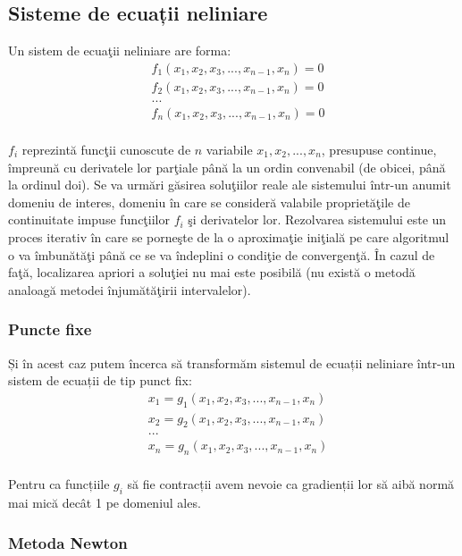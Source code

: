 \documentclass{exam}
\begin{document}
\subsection{Sisteme de ecuații neliniare}
Un sistem de ecuaţii neliniare are forma:
\begin{align*}
	 & f_{1}(x_{1},x_{2},x_{3},...,x_{n-1},x_{n})=0 \\
	 & f_{2}(x_{1},x_{2},x_{3},...,x_{n-1},x_{n})=0 \\
	 & ...                                          \\
	 & f_{n}(x_{1},x_{2},x_{3},...,x_{n-1},x_{n})=0 \\
\end{align*}

$f_{i}$ reprezintă funcţii cunoscute de $n$ variabile $x_{1}, x_{2}, ..., x_{n}$,
presupuse continue, împreună cu derivatele lor parţiale până la un ordin
convenabil (de obicei, până la ordinul doi). Se va urmări găsirea soluţiilor
reale ale sistemului într-un anumit domeniu de interes, domeniu în care se
consideră valabile proprietăţile de continuitate impuse funcţiilor
$f_{i}$ şi derivatelor lor. Rezolvarea sistemului este un proces iterativ în
care se porneşte de la o aproximaţie iniţială pe care algoritmul o va îmbunătăţi
până ce se va îndeplini o condiţie de convergenţă. În cazul de faţă, localizarea
apriori a soluţiei nu mai este posibilă (nu există o metodă analoagă metodei
înjumătăţirii intervalelor).

\subsubsection{Puncte fixe}

Și în acest caz putem încerca să transformăm sistemul de ecuații neliniare
într-un sistem de ecuații de tip punct fix:
\begin{align*}
	 & x_{1} = g_{1}(x_{1},x_{2},x_{3},...,x_{n-1},x_{n}) \\
	 & x_{2} = g_{2}(x_{1},x_{2},x_{3},...,x_{n-1},x_{n}) \\
	 & ...                                                \\
	 & x_{n} = g_{n}(x_{1},x_{2},x_{3},...,x_{n-1},x_{n}) \\
\end{align*}

Pentru ca funcțiile $g_{i}$ să fie contracții avem nevoie ca gradienții lor să
aibă normă mai mică decât 1 pe domeniul ales.

\subsubsection{Metoda Newton}
\end{document}
